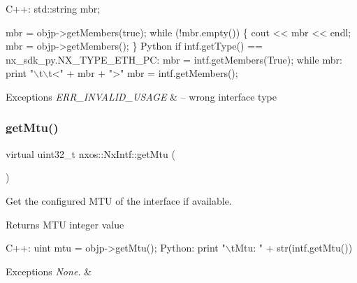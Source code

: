 \begin{DoxyCode}
C++:
      std::string mbr;

      mbr = objp->getMembers(\textcolor{keyword}{true});
      \textcolor{keywordflow}{while} (!mbr.empty()) \{
          cout << mbr << endl;
          mbr = objp->getMembers();
      \}
Python
      \textcolor{keywordflow}{if} intf.getType() == nx\_sdk\_py.NX\_TYPE\_ETH\_PC:
         mbr = intf.getMembers(True);
         \textcolor{keywordflow}{while} mbr:
            print \textcolor{stringliteral}{"\(\backslash\)t\(\backslash\)t<"} + mbr + \textcolor{stringliteral}{">"}
            mbr = intf.getMembers();
\end{DoxyCode}



\begin{DoxyExceptions}{Exceptions}
{\em E\+R\+R\+\_\+\+I\+N\+V\+A\+L\+I\+D\+\_\+\+U\+S\+A\+GE} & -- wrong interface type \\
\hline
\end{DoxyExceptions}
\mbox{\label{classnxos_1_1_nx_intf_ae0b1d1c5fed67948cb0bbb9040a8f4de}} 
\subsubsection{\texorpdfstring{get\+Mtu()}{getMtu()}}
{\footnotesize\ttfamily virtual uint32\+\_\+t nxos\+::\+Nx\+Intf\+::get\+Mtu (\begin{DoxyParamCaption}{ }\end{DoxyParamCaption})\hspace{0.3cm}{\ttfamily [pure virtual]}}

Get the configured M\+TU of the interface if available.

\begin{DoxyReturn}{Returns}
M\+TU integer value
\end{DoxyReturn}

\begin{DoxyCode}
C++:
      uint mtu =  objp->getMtu();
Python:
      print \textcolor{stringliteral}{"\(\backslash\)tMtu: "} + str(intf.getMtu())
\end{DoxyCode}



\begin{DoxyExceptions}{Exceptions}
{\em None.} & \\
\hline
\end{DoxyExceptions}
\mbox{\label{classnxos_1_1_nx_intf_a8a0bff66b97d72172f8ed5ce22d8efbd}} 
